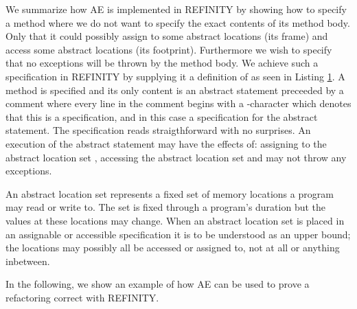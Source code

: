 We summarize how AE is implemented in REFINITY by showing how to specify a method  where we do not want to specify the exact contents of its method body.
Only that it could possibly assign to some abstract locations (its frame) and access some abstract locations (its footprint).
Furthermore we wish to specify that no exceptions will be thrown by the method body.
We achieve such a specification in REFINITY by supplying it a definition of  as seen in Listing \ref{lst:ExtractVariable-refinity-method}.
A method is specified and its only content is an abstract statement  preceeded by a comment where every line in the
comment begins with a -character which denotes that this is a specification, and in this case a specification for the abstract statement.
The specification reads straigthforward with no surprises. An execution of the abstract statement  may have the effects of: assigning to the
abstract location set , accessing the abstract location set  and may not throw any exceptions.

An abstract location set represents a fixed set of memory locations a program may read or write to.
The set is fixed through a program's duration but the values at these locations may change.
When an abstract location set is placed in an assignable or accessible specification it is to be understood as an upper bound;
the locations may possibly all be accessed or assigned to, not at all or anything inbetween.

\begin{figure}[h]
  \centering
  \begin{minipage}{.65\linewidth}
  
  \label{lst:ExtractVariable-refinity-method}
  \end{minipage}
\end{figure}


In the following, we show an example of how AE can be used to prove a refactoring correct with REFINITY. 

